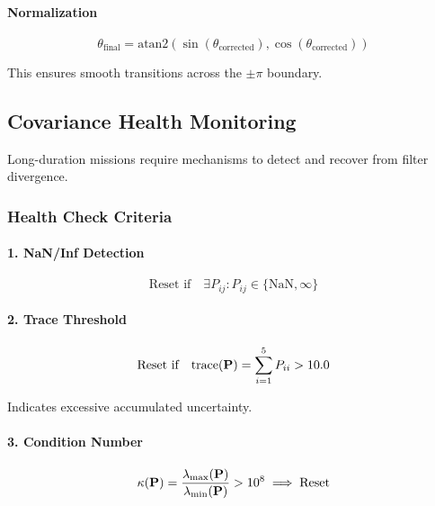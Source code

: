 \paragraph{Normalization}
\begin{equation}
\theta_{\text{final}} = \text{atan2}(\sin(\theta_{\text{corrected}}), \cos(\theta_{\text{corrected}}))
\label{eq:yaw_normalization}
\end{equation}

This ensures smooth transitions across the $\pm \pi$ boundary.

\subsection{Covariance Health Monitoring}

Long-duration missions require mechanisms to detect and recover from filter divergence.

\subsubsection{Health Check Criteria}

\paragraph{1. NaN/Inf Detection}
\begin{equation}
\text{Reset if} \quad \exists P_{ij} : P_{ij} \in \{\text{NaN}, \infty\}
\label{eq:health_nan}
\end{equation}

\paragraph{2. Trace Threshold}
\begin{equation}
\text{Reset if} \quad \text{trace}(\mathbf{P}) = \sum_{i=1}^{5} P_{ii} > 10.0
\label{eq:health_trace}
\end{equation}

Indicates excessive accumulated uncertainty.

\paragraph{3. Condition Number}
\begin{equation}
\kappa(\mathbf{P}) = \frac{\lambda_{\max}(\mathbf{P})}{\lambda_{\min}(\mathbf{P})} > 10^8 \implies \text{Reset}
\label{eq:health_condition}
\end{equation}

